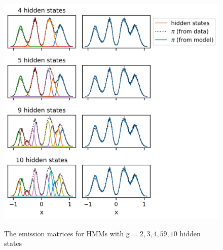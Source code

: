 \begin{figure}
    \centering
    \caption{The emission matrices for HMMs with g = $2, 3, 4, 5 9, 10$ hidden states}
    \includegraphics{chapters/hmm_selection/figures/prinz_emitted_densities_tau_5.png}
    \label{fig:prinz_emission_dens_tau_5}
\end{figure}












